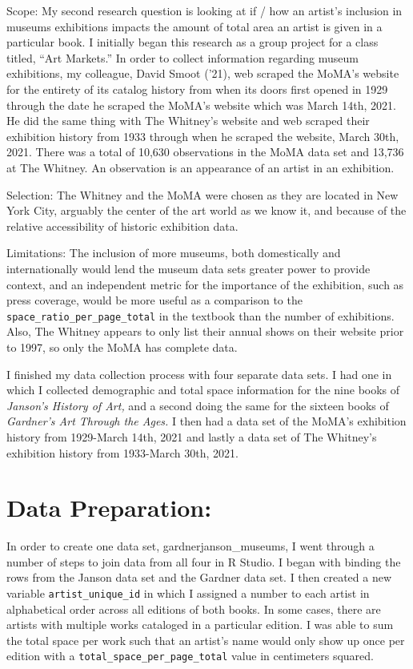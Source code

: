 \documentclass[
  letterpaper,
  DIV=11,
  numbers=noendperiod]{scrreprt}
\begin{document}
Scope: My second research question is looking at if / how an artist's
inclusion in museums exhibitions impacts the amount of total area an
artist is given in a particular book. I initially began this research as
a group project for a class titled, ``Art Markets.'' In order to collect
information regarding museum exhibitions, my colleague, David Smoot
('21), web scraped the MoMA's website for the entirety of its catalog
history from when its doors first opened in 1929 through the date he
scraped the MoMA's website which was March 14th, 2021. He did the same
thing with The Whitney's website and web scraped their exhibition
history from 1933 through when he scraped the website, March 30th, 2021.
There was a total of 10,630 observations in the MoMA data set and 13,736
at The Whitney. An observation is an appearance of an artist in an
exhibition.

Selection: The Whitney and the MoMA were chosen as they are located in
New York City, arguably the center of the art world as we know it, and
because of the relative accessibility of historic exhibition data.~

Limitations: The inclusion of more museums, both domestically and
internationally would lend the museum data sets greater power to provide
context, and an independent metric for the importance of the exhibition,
such as press coverage, would be more useful as a comparison to the
\texttt{space\_ratio\_per\_page\_total} in the textbook than the number
of exhibitions. Also, The Whitney appears to only list their annual
shows on their website prior to 1997, so only the MoMA has complete
data.

I finished my data collection process with four separate data sets. I
had one in which I collected demographic and total space information for
the nine books of \emph{Janson's History of Art,} and a second doing the
same for the sixteen books of \emph{Gardner's Art Through the Ages.} I
then had a data set of the MoMA's exhibition history from 1929-March
14th, 2021 and lastly a data set of The Whitney's exhibition history
from 1933-March 30th, 2021.

\hypertarget{data-preparation}{%
\section{Data Preparation:}\label{data-preparation}}

In order to create one data set, gardnerjanson\_museums, I went through
a number of steps to join data from all four in R Studio. I began with
binding the rows from the Janson data set and the Gardner data set. I
then created a new variable \texttt{artist\_unique\_id} in which I
assigned a number to each artist in alphabetical order across all
editions of both books. In some cases, there are artists with multiple
works cataloged in a particular edition. I was able to sum the total
space per work such that an artist's name would only show up once per
edition with a \texttt{total\_space\_per\_page\_total} value in
centimeters squared.
\end{document}
